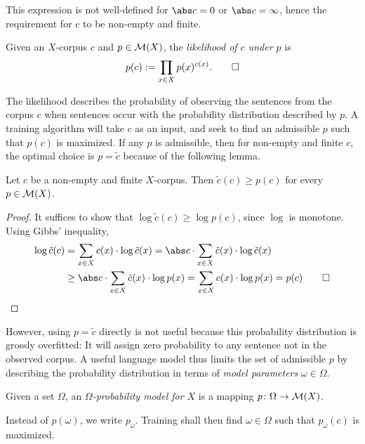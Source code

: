 This expression is not well-defined for $\abs c = 0$ or $\abs c = \infty$,
hence the requirement for $c$ to be non-empty and finite.

\begin{definition}
 Given an $X$-corpus $c$ and $p\in\mathcal M(X)$, the \emph{likelihood of $c$ under
 $p$} is
 \[
  p(c) := \prod_{x\in X} p(x)^{c(x)}. \qedhere
 \]
\end{definition}

The likelihood describes the probability of observing the sentences from the
corpus $c$ when sentences occur with the probability distribution described by
$p$. A training algorithm will take $c$ as an input, and seek to find an
admissible $p$ such that $p(c)$ is maximized. If any $p$ is admissible, then
for non-empty and finite $c$, the optimal choice is $p = \tilde c$ because of
the following lemma.

\begin{lemma}\label{lemma:empirical1}
 Let $c$ be a non-empty and finite $X$-corpus. Then $\tilde c(c) \geq p(c)$ for
 every $p\in\mathcal M(X)$.
\end{lemma}

\begin{proof}
 It suffices to show that $\log\tilde c(c) \geq \log p(c)$, since $\log$ is
 monotone. Using Gibbs' inequality,
 \begin{align*}
  \log \tilde c(c)
  &= \sum_{x\in X} c(x) \cdot \log \tilde c(x)
  = \abs c \cdot \sum_{x\in X} \tilde c(x) \cdot \log \tilde c(x) \\
  &\geq \abs c \cdot \sum_{x\in X} \tilde c(x) \cdot \log p(x)
  = \sum_{x\in X} c(x) \cdot \log p(x)
  = p(c)
  \qedhere
 \end{align*}
\end{proof}

However, using $p = \tilde c$ directly is not useful because this probability
distribution is grossly overfitted: It will assign zero probability to any
sentence not in the observed corpus. A useful language model thus limits the
set of admissible $p$ by describing the probability distribution in terms of
\emph{model parameters} $\omega\in\Omega$.

\begin{definition}
 Given a set $\Omega$, an \emph{$\Omega$-probability model for $X$} is a
 mapping $p\colon\Omega\to\mathcal M(X)$.
\end{definition}

Instead of $p(\omega)$, we write $p_\omega$. Training shall then find
$\omega\in\Omega$ such that $p_\omega(c)$ is maximized.

